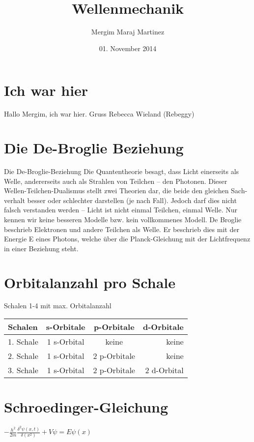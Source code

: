 \documentclass{article}
\author{Mergim Maraj Martinez}
\title{Wellenmechanik}
\date{01. November 2014}
\begin{document}
\maketitle

\section{Ich war hier}
Hallo Mergim, ich war hier. Gruss Rebecca Wieland (Rebeggy)
\section{Die De-Broglie Beziehung}
Die De-Broglie-Beziehung
Die Quantentheorie besagt, dass Licht einerseits als Welle, andererseits auch als Strahlen von Teilchen – den Photonen. Dieser Wellen-Teilchen-Dualismus stellt zwei Theorien dar, die beide den gleichen Sach-verhalt besser oder schlechter darstellen (je nach Fall). Jedoch darf dies nicht falsch verstanden werden – Licht ist nicht einmal Teilchen, einmal Welle. Nur kennen wir keine besseren Modelle bzw. kein vollkommenes Modell. De Broglie beschrieb Elektronen und andere Teilchen als Welle. Er beschrieb dies mit der Energie E eines Photons, welche über die Planck-Gleichung mit der Lichtfrequenz in einer Beziehung steht.

\section{Orbitalanzahl pro Schale}
Schalen 1-4 mit max. Orbitalanzahl
\begin{center}
\begin{tabular}{l|c|c|r}
Schalen & s-Orbitale & p-Orbitale & d-Orbitale\\
\hline
1. Schale & 1 s-Orbital & keine & keine \\
2. Schale & 1 s-Orbital & 2 p-Orbitale & keine\\
3. Schale & 1 s-Orbital & 2 p-Orbitale & 2 d-Orbital\\
\end{tabular}
\end{center}
\section{Schroedinger-Gleichung}
\begin{center}
$-\frac{h^{2}}{2m}\frac{\delta^{2}\psi(x,t)}{\delta(x^{2})}+V\psi=E\psi(x)$
\end{center}
\end{document}
